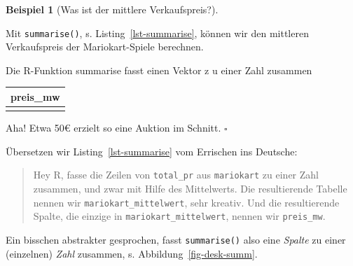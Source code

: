 \documentclass[
  letterpaper,
]{scrbook}
\newenvironment{Shaded}{\begin{snugshade}}{\end{snugshade}}
\newcommand{\AttributeTok}[1]{\textcolor[rgb]{0.40,0.45,0.13}{#1}}
\newcommand{\FunctionTok}[1]{\textcolor[rgb]{0.28,0.35,0.67}{#1}}
\newcommand{\NormalTok}[1]{\textcolor[rgb]{0.00,0.23,0.31}{#1}}
\newcommand{\OtherTok}[1]{\textcolor[rgb]{0.00,0.23,0.31}{#1}}
\theoremstyle{definition}
\theoremstyle{definition}
\newtheorem{example}{Beispiel}[chapter]
\theoremstyle{definition}
\theoremstyle{remark}
\begin{document}
\begin{example}[Was ist der mittlere
Verkaufspreis?]\protect\hypertarget{exm-summarise}{}\label{exm-summarise}

Mit \texttt{summarise()}, s. Listing~\ref{lst-summarise}, können wir den
mittleren Verkaufspreis der Mariokart-Spiele berechnen.

\begin{codelisting}

\caption{\label{lst-summarise}Die R-Funktion summarise fasst einen
Vektor z u einer Zahl zusammen}

\centering{

\begin{Shaded}
\begin{Highlighting}[]
\NormalTok{mariokart\_mittelwert }\OtherTok{\textless{}{-}} \FunctionTok{summarise}\NormalTok{(mariokart,}
                                  \AttributeTok{preis\_mw =} \FunctionTok{mean}\NormalTok{(total\_pr))}
\NormalTok{mariokart\_mittelwert}
\end{Highlighting}
\end{Shaded}

}

\end{codelisting}%

\begin{longtable}[]{@{}r@{}}
\toprule\noalign{}
preis\_mw \\
\midrule\noalign{}
\endhead
\bottomrule\noalign{}
\endlastfoot
50 \\
\end{longtable}

Aha! Etwa 50€ erzielt so eine Auktion im Schnitt. \(\square\)

\end{example}

Übersetzen wir Listing~\ref{lst-summarise} vom Errischen ins Deutsche:

\begin{quote}
{} Hey R, fasse die Zeilen von \texttt{total\_pr} aus
\texttt{mariokart} zu einer Zahl zusammen, und zwar mit Hilfe des
Mittelwerts. Die resultierende Tabelle nennen wir
\texttt{mariokart\_mittelwert}, sehr kreativ. Und die resultierende
Spalte, die einzige in \texttt{mariokart\_mittelwert}, nennen wir
\texttt{preis\_mw}.
\end{quote}

Ein bisschen abstrakter gesprochen, fasst \texttt{summarise()} also eine
\emph{Spalte} zu einer (einzelnen) \emph{Zahl} zusammen, s.
Abbildung~\ref{fig-desk-summ}.
\end{document}
